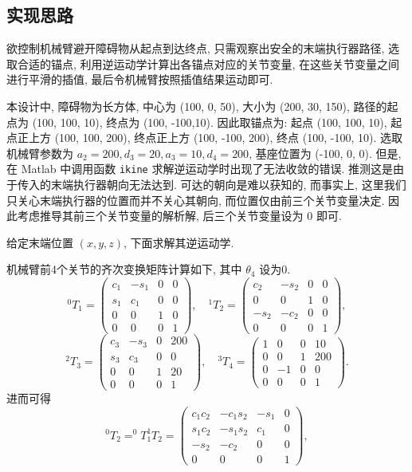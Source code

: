 \documentclass{article}
\begin{document}
\subsection{实现思路}
欲控制机械臂避开障碍物从起点到达终点, 只需观察出安全的末端执行器路径, 选取合适的锚点, 利用逆运动学计算出各锚点对应的关节变量, 在这些关节变量之间进行平滑的插值, 最后令机械臂按照插值结果运动即可.\par
本设计中, 障碍物为长方体, 中心为 (100, 0, 50), 大小为 (200, 30, 150), 路径的起点为 (100, 100, 10), 终点为 (100, -100,10). 因此取锚点为: 起点 (100, 100, 10), 起点正上方 (100, 100, 200), 终点正上方 (100, -100, 200), 终点 (100, -100, 10). 选取机械臂参数为 $a_2=200, d_3=20, a_3=10, d_4=200$, 基座位置为 (-100, 0, 0). 但是, 在 Matlab 中调用函数 \verb|ikine| 求解逆运动学时出现了无法收敛的错误. 推测这是由于传入的末端执行器朝向无法达到. 可达的朝向是难以获知的, 而事实上, 这里我们只关心末端执行器的位置而并不关心其朝向, 而位置仅由前三个关节变量决定. 因此考虑推导其前三个关节变量的解析解, 后三个关节变量设为 0 即可.\par
给定末端位置 $(x,y,z)$, 下面求解其逆运动学.\par
机械臂前4个关节的齐次变换矩阵计算如下, 其中 $\theta_4$ 设为0.
\[
^0T_1 = 
\begin{pmatrix}
c_1 & -s_1 & 0 & 0\\
s_1 & c_1 & 0 & 0\\
0 & 0 & 1 & 0\\
0 & 0 & 0 & 1
\end{pmatrix}, \quad
^1T_2 = 
\begin{pmatrix}
c_2 & -s_2 & 0 & 0\\
0 & 0 & 1 & 0\\
-s_2 & -c_2 & 0 & 0\\
0 & 0 & 0 & 1
\end{pmatrix},
\]
\[
^2T_3 = 
\begin{pmatrix}
c_3 & -s_3 & 0 & 200\\
s_3 & c_3 & 0 & 0\\
0 & 0 & 1 & 20\\
0 & 0 & 0 & 1
\end{pmatrix}, \quad
^3T_4 = 
\begin{pmatrix}
1 & 0 & 0 & 10\\
0 & 0 & 1 & 200\\
0 & -1 & 0 & 0\\
0 & 0 & 0 & 1
\end{pmatrix}.
\]
进而可得
\[
^0T_2 = ^0T_1 ^1T_2 = 
\begin{pmatrix}
c_1 c_2 & -c_1 s_2 & -s_1 & 0\\
s_1 c_2 & -s_1 s_2 & c_1 & 0\\
-s_2 & -c_2 & 0 & 0\\
0 & 0 & 0 & 1
\end{pmatrix},
\]
\end{document}
